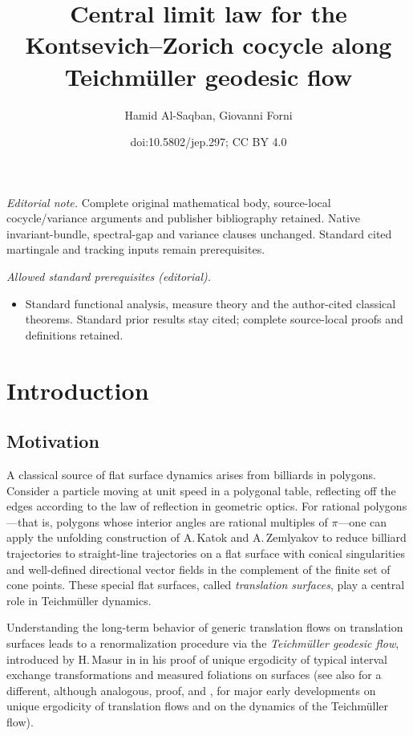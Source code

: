 \documentclass[10pt]{amsart}
\title{Central limit law for the Kontsevich–Zorich cocycle along Teichmüller geodesic flow}
\author{Hamid Al-Saqban, Giovanni Forni}
\date{doi:10.5802/jep.297; CC BY 4.0}
\theoremstyle{plain}
\theoremstyle{definition}
\numberwithin{equation}{subsection}
\begin{document}
\maketitle
\noindent\textit{Editorial note.} Complete original mathematical body, source-local cocycle/variance arguments and publisher bibliography retained. Native invariant-bundle, spectral-gap and variance clauses unchanged. Standard cited martingale and tracking inputs remain prerequisites.\par\medskip
\noindent\textit{Allowed standard prerequisites (editorial).}\begin{itemize}
\item Standard functional analysis, measure theory and the author-cited classical theorems. Standard prior results stay cited; complete source-local proofs and definitions retained.
\end{itemize}\medskip

\tableofcontents


\vspace*{-2.5\baselineskip}\vskip0pt\enlargethispage{.5\baselineskip}%
\section{Introduction}

\subsection{Motivation} A classical source of flat surface dynamics arises from billiards in polygons. Consider a particle moving at unit speed in a polygonal table, reflecting off the edges according to the law of reflection in geometric optics. For rational polygons—that is, polygons whose interior angles are rational multiples of $\pi$—one can apply the unfolding construction of A.\,Katok and A.\,Zemlyakov \cite{ZK75} to reduce billiard trajectories to straight-line trajectories on a flat surface with conical singularities and well-defined directional vector fields in the complement of the finite set of cone points. These special flat surfaces, called \emph{translation surfaces}, play a central role in Teichmüller dynamics.

Understanding the long-term behavior of generic translation flows on translation surfaces leads to a renormalization procedure via the \emph{Teichmüller geodesic flow}, introduced by H.\,Masur in \cite{Ma82} in his proof of unique ergodicity of
typical interval exchange transformations and measured foliations on surfaces (see also \cite{Vc82} for a different, although analogous, proof, and \cite{KMS86}, \cite{Vc86} for major early developments on unique ergodicity of translation flows and on the dynamics of the Teichmüller flow).
\end{document}

